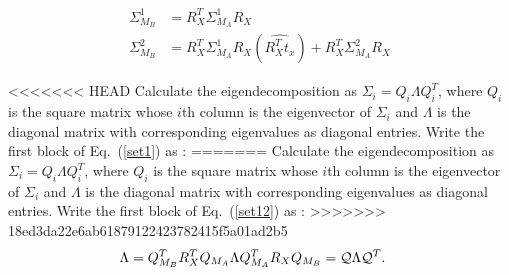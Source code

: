 \documentclass[twocolumn,10pt]{asme2ej}
\begin{document}
\begin{subequations} 
\begin{align}
\Sigma_{M_B}^1 &=  R^T_X \Sigma_{M_A}^1 R_X \label{set11} \\
\Sigma_{M_B}^2 &=  R^T_X \Sigma_{M_A}^1 R_X(\widehat{R^T_X t_x}) + R^T_X \Sigma_{M_A}^2 R_X  \label{set12}
\end{align}
\end{subequations}

<<<<<<< HEAD
Calculate the eigendecomposition as $ \Sigma_{i}=Q_i \Lambda Q_i^T$, where $Q_i$ is the square matrix whose $i$th column is the eigenvector of $\Sigma_i$ and $\Lambda$ is the diagonal matrix with corresponding eigenvalues as diagonal entries. Write the first block of Eq.~(\ref{set1}) as \cite{ackermanGSI, ackermanIROS2013}:
=======
Calculate the eigendecomposition as $ \Sigma_{i}=Q_i \Lambda Q_i^T$, where $Q_i$ is the square matrix whose $i$th column is the eigenvector of $\Sigma_i$ and $\Lambda$ is the diagonal matrix with corresponding eigenvalues as diagonal entries. Write the first block of Eq.~(\ref{set12}) as \cite{ackermanGSI, ackermanIROS2013}:
>>>>>>> 18ed3da22e6ab61879122423782415f5a01ad2b5
\begin{align}
\Lambda &= Q_{M_B}^T R_X^T Q_{M_A} \Lambda Q_{M_A}^T R_X Q_{M_B} = {\cal Q} \Lambda {\cal Q}^T.
\label{QAQ}
\end{align}

\end{document}
